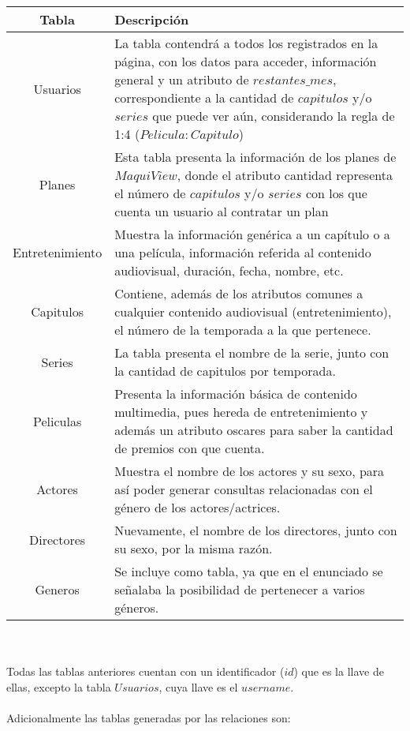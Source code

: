 \documentclass[letter]{article}
\begin{document}
\begin{pregunta}{1}
		\begin{tabular}{ c|p{12cm} }
			Tabla & Descripción\\
			\hline
			Usuarios & La tabla contendrá a todos los registrados en la página, con los datos para acceder, información general y un atributo de $restantes\_mes$, correspondiente a la cantidad de $capitulos$ y/o $series$ que puede ver aún, considerando la regla de 1:4 ($Pelicula:Capitulo$)\\
			\hline
			Planes & Esta tabla presenta la información de los planes de $MaquiView$, donde el atributo cantidad representa el número de $capitulos$ y/o $series$ con los que cuenta un usuario al contratar un plan\\
			\hline
			Entretenimiento & Muestra la información genérica a un capítulo o a una película, información referida al contenido audiovisual, duración, fecha, nombre, etc. \\
			\hline
			Capitulos & Contiene, además de los atributos comunes a cualquier contenido audiovisual (entretenimiento), el número de la temporada a la que pertenece.\\
			\hline
			Series & La tabla presenta el nombre de la serie, junto con la cantidad de capitulos por temporada.\\
			\hline
			Peliculas & Presenta la información básica de contenido multimedia, pues hereda de entretenimiento y además un atributo oscares para saber la cantidad de premios con que cuenta.\\
			\hline
			Actores & Muestra el nombre de los actores y su sexo, para así poder generar consultas relacionadas con el género de los actores/actrices.\\
			\hline
			Directores & Nuevamente, el nombre de los directores, junto con su sexo, por la misma razón.\\
			\hline
			Generos & Se incluye como tabla, ya que en el enunciado se señalaba la posibilidad de pertenecer a varios géneros.\\
		\end{tabular}\\ \\

		Todas las tablas anteriores cuentan con un identificador ($id$) que es la llave de ellas, excepto la tabla $Usuarios$, cuya llave es el $username$.\\ \\
		Adicionalmente las tablas generadas por las relaciones son: \\


\end{pregunta}
\end{document}
